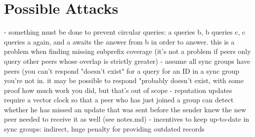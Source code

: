 \section{Possible Attacks}


- something must be done to prevent circular queries: a queries b, b queries c,
  c queries a again, and a awaits the answer from b in order to answer. this is
  a problem when finding missing subprefix coverage (it's not a problem if peers
  only query other peers whose overlap is strictly greater)
- assume all sync groups have peers (you can't respond "doesn't exist" for a
  query for an ID in a sync group you're not in. it may be possible to respond
  "probably doesn't exist, with some proof how much work you did, but that's out
  of scope
- reputation updates require a vector clock so that a peer who has just joined a
  group can detect whether he has missed an update that was sent before the
  sender knew the new peer needed to receive it as well (see notes.md)
- incentives to keep up-to-date in sync groups: indirect, huge penalty for
  providing outdated records
